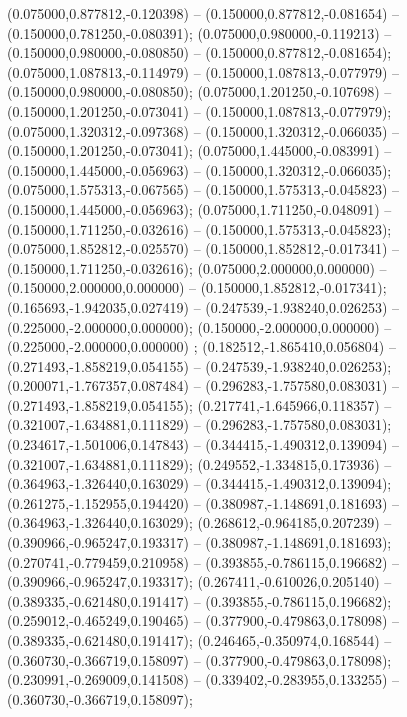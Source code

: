  (0.075000,0.877812,-0.120398) -- (0.150000,0.877812,-0.081654) -- (0.150000,0.781250,-0.080391);
 (0.075000,0.980000,-0.119213) -- (0.150000,0.980000,-0.080850) -- (0.150000,0.877812,-0.081654);
 (0.075000,1.087813,-0.114979) -- (0.150000,1.087813,-0.077979) -- (0.150000,0.980000,-0.080850);
 (0.075000,1.201250,-0.107698) -- (0.150000,1.201250,-0.073041) -- (0.150000,1.087813,-0.077979);
 (0.075000,1.320312,-0.097368) -- (0.150000,1.320312,-0.066035) -- (0.150000,1.201250,-0.073041);
 (0.075000,1.445000,-0.083991) -- (0.150000,1.445000,-0.056963) -- (0.150000,1.320312,-0.066035);
 (0.075000,1.575313,-0.067565) -- (0.150000,1.575313,-0.045823) -- (0.150000,1.445000,-0.056963);
 (0.075000,1.711250,-0.048091) -- (0.150000,1.711250,-0.032616) -- (0.150000,1.575313,-0.045823);
 (0.075000,1.852812,-0.025570) -- (0.150000,1.852812,-0.017341) -- (0.150000,1.711250,-0.032616);
 (0.075000,2.000000,0.000000) -- (0.150000,2.000000,0.000000) -- (0.150000,1.852812,-0.017341);
 (0.165693,-1.942035,0.027419) -- (0.247539,-1.938240,0.026253) -- (0.225000,-2.000000,0.000000);
 (0.150000,-2.000000,0.000000) -- (0.225000,-2.000000,0.000000) ;
 (0.182512,-1.865410,0.056804) -- (0.271493,-1.858219,0.054155) -- (0.247539,-1.938240,0.026253);
 (0.200071,-1.767357,0.087484) -- (0.296283,-1.757580,0.083031) -- (0.271493,-1.858219,0.054155);
 (0.217741,-1.645966,0.118357) -- (0.321007,-1.634881,0.111829) -- (0.296283,-1.757580,0.083031);
 (0.234617,-1.501006,0.147843) -- (0.344415,-1.490312,0.139094) -- (0.321007,-1.634881,0.111829);
 (0.249552,-1.334815,0.173936) -- (0.364963,-1.326440,0.163029) -- (0.344415,-1.490312,0.139094);
 (0.261275,-1.152955,0.194420) -- (0.380987,-1.148691,0.181693) -- (0.364963,-1.326440,0.163029);
 (0.268612,-0.964185,0.207239) -- (0.390966,-0.965247,0.193317) -- (0.380987,-1.148691,0.181693);
 (0.270741,-0.779459,0.210958) -- (0.393855,-0.786115,0.196682) -- (0.390966,-0.965247,0.193317);
 (0.267411,-0.610026,0.205140) -- (0.389335,-0.621480,0.191417) -- (0.393855,-0.786115,0.196682);
 (0.259012,-0.465249,0.190465) -- (0.377900,-0.479863,0.178098) -- (0.389335,-0.621480,0.191417);
 (0.246465,-0.350974,0.168544) -- (0.360730,-0.366719,0.158097) -- (0.377900,-0.479863,0.178098);
 (0.230991,-0.269009,0.141508) -- (0.339402,-0.283955,0.133255) -- (0.360730,-0.366719,0.158097);
